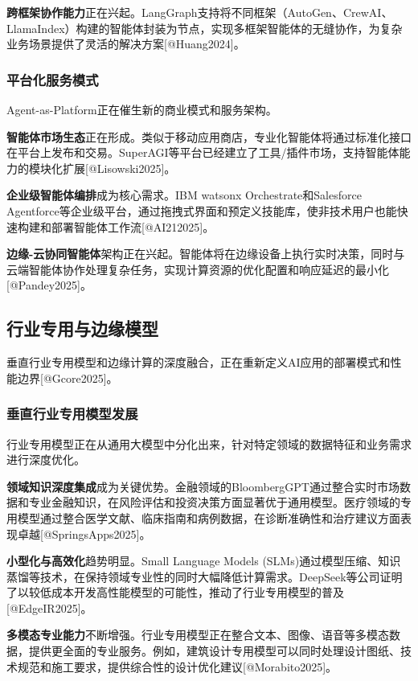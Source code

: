 \documentclass{article}
\begin{document}
\textbf{跨框架协作能力}正在兴起。LangGraph支持将不同框架（AutoGen、CrewAI、LlamaIndex）构建的智能体封装为节点，实现多框架智能体的无缝协作，为复杂业务场景提供了灵活的解决方案[@Huang2024]。

\subsubsection{平台化服务模式}
Agent-as-Platform正在催生新的商业模式和服务架构。

\textbf{智能体市场生态}正在形成。类似于移动应用商店，专业化智能体将通过标准化接口在平台上发布和交易。SuperAGI等平台已经建立了工具/插件市场，支持智能体能力的模块化扩展[@Lisowski2025]。

\textbf{企业级智能体编排}成为核心需求。IBM watsonx Orchestrate和Salesforce Agentforce等企业级平台，通过拖拽式界面和预定义技能库，使非技术用户也能快速构建和部署智能体工作流[@AI212025]。

\textbf{边缘-云协同智能体}架构正在兴起。智能体将在边缘设备上执行实时决策，同时与云端智能体协作处理复杂任务，实现计算资源的优化配置和响应延迟的最小化[@Pandey2025]。

\subsection{行业专用与边缘模型}
垂直行业专用模型和边缘计算的深度融合，正在重新定义AI应用的部署模式和性能边界[@Gcore2025]。

\subsubsection{垂直行业专用模型发展}
行业专用模型正在从通用大模型中分化出来，针对特定领域的数据特征和业务需求进行深度优化。

\textbf{领域知识深度集成}成为关键优势。金融领域的BloombergGPT通过整合实时市场数据和专业金融知识，在风险评估和投资决策方面显著优于通用模型。医疗领域的专用模型通过整合医学文献、临床指南和病例数据，在诊断准确性和治疗建议方面表现卓越[@SpringsApps2025]。

\textbf{小型化与高效化}趋势明显。Small Language Models (SLMs)通过模型压缩、知识蒸馏等技术，在保持领域专业性的同时大幅降低计算需求。DeepSeek等公司证明了以较低成本开发高性能模型的可能性，推动了行业专用模型的普及[@EdgeIR2025]。

\textbf{多模态专业能力}不断增强。行业专用模型正在整合文本、图像、语音等多模态数据，提供更全面的专业服务。例如，建筑设计专用模型可以同时处理设计图纸、技术规范和施工要求，提供综合性的设计优化建议[@Morabito2025]。
\end{document}
